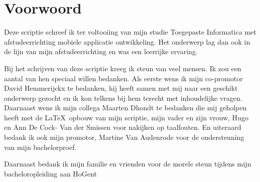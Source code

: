 \chapter*{Voorwoord}\label{ch:voorwoord}
Deze scriptie schreef ik ter voltooiing van mijn studie Toegepaste Informatica met afstudeerrichting mobiele applicatie ontwikkeling. Het onderwerp lag dan ook in de lijn van mijn afstudeerrichting en was een leerrijke ervaring. 

Bij het schrijven van deze scriptie kreeg ik steun van veel mensen. Ik zou een aantal van hen speciaal willen bedanken. Als eerste wens ik mijn co-promotor David Hemmerijckx te bedanken, hij heeft samen met mij naar een geschikt onderwerp gezocht en ik kon telkens bij hem terecht met inhoudelijke vragen. Daarnaast wens ik mijn collega Maarten Dhondt te bedanken die mij geholpen heeft met de \LaTeX\ opbouw van mijn scriptie, mijn vader en zijn vrouw, Hugo en Ann De Cock- Van der Smissen voor nakijken op taalfouten. En uiteraard bedank ik ook mijn promotor, Martine Van Audenrode voor de ondersteuning van mijn bachelorproef. 

Daarnaast bedank ik mijn familie en vrienden voor de morele steun tijdens mijn bacheloropleiding aan HoGent



    